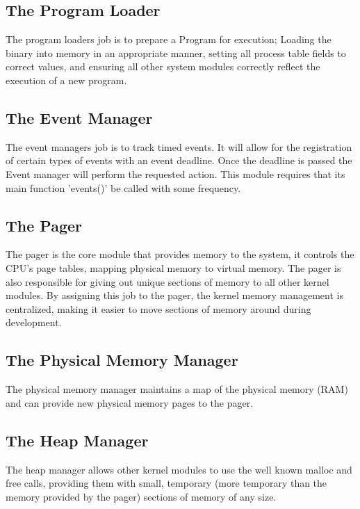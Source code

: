 \documentclass[a4paper]{report}
\begin{document}
\subsection{The Program Loader}

The program loaders job is to prepare a Program for execution; Loading the binary into memory in an appropriate manner, setting all process table fields to correct values, and ensuring all other system modules correctly reflect the execution of a new program.

\subsection{The Event Manager}

The event managers job is to track timed events. It will allow for the registration of certain types of events with an event deadline. Once the deadline is passed the Event manager will perform the requested action. This module requires that its main function 'events()' be called with some frequency.

\subsection{The Pager}

The pager is the core module that provides memory to the system, it controls the CPU's page tables, mapping physical memory to virtual memory. The pager is also responsible for giving out unique sections of memory to all other kernel modules. By assigning this job to the pager, the kernel memory management is centralized, making it easier to move sections of memory around during development.

\subsection{The Physical Memory Manager}

The physical memory manager maintains a map of the physical memory (RAM) and can provide new physical memory pages to the pager.

\subsection{The Heap Manager}

The heap manager allows other kernel modules to use the well known malloc and free calls, providing them with small, temporary (more temporary than the memory provided by the pager) sections of memory of any size.
\end{document}
